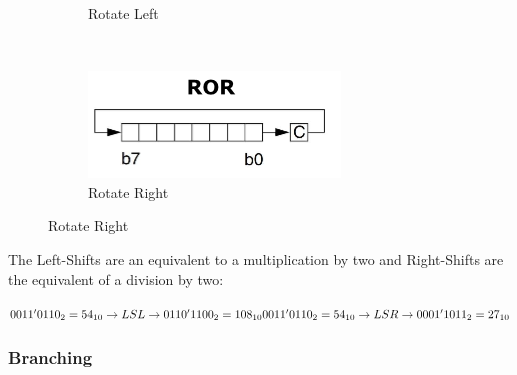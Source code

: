 \documentclass[a4paper, 11pt, nofootinbib]{article}
\begin{document}
\begin{figure}[htb]
\begin{subfigure}[b]{0.5\textwidth}
		\caption{Rotate Left}
	\end{subfigure}%
	~ 
	\begin{subfigure}[b]{0.5\textwidth}
		\centering
		\includegraphics[keepaspectratio=true, height=7.5\baselineskip]{ROR.PNG}
		\caption{Rotate Right}
	\end{subfigure}
\end{figure}

\noindent The Left-Shifts are an equivalent to a multiplication by two and Right-Shifts are the equivalent of a division by two:

\noindent 
$
0011'0110_{2} = 54_{10} \rightarrow LSL \rightarrow 0110'1100_{2} = 108_{10} \\
0011'0110_{2} = 54_{10} \rightarrow LSR \rightarrow 0001'1011_{2} = 27_{10}
$

\subsubsection{Branching}
\end{document}

